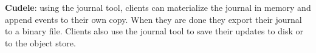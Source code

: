 \noindent\textbf{Cudele}: using the journal tool, clients can materialize the
journal in memory and append events to their own copy. When they are done they
export their journal to a binary file. Clients also use the journal tool to
save their updates to disk or to the object store.





%

